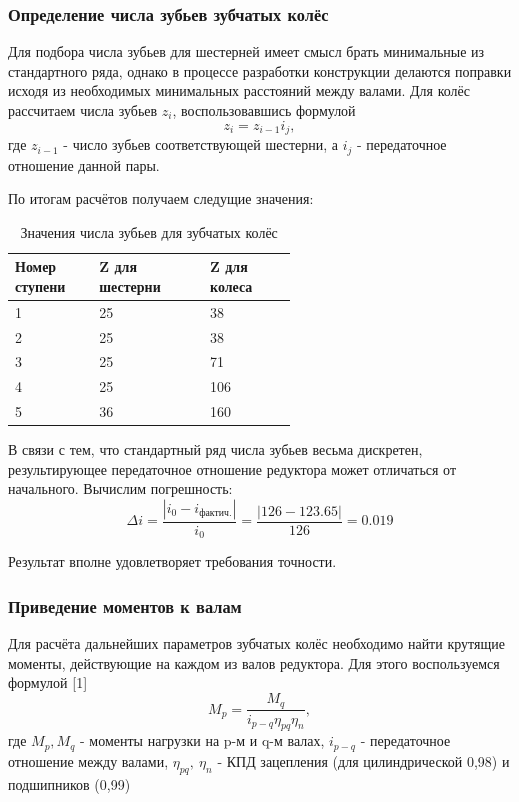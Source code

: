 \documentclass[14pt,a4paper,russian]{scrartcl}
\begin{document}
    \subsubsection{Определение числа зубьев зубчатых колёс}
        Для подбора числа зубьев для шестерней имеет смысл брать минимальные из стандартного ряда,
        однако в процессе разработки конструкции делаются поправки исходя из необходимых
        минимальных расстояний между валами.
        Для колёс рассчитаем числа зубьев \( z_i \), воспользовавшись формулой
        \[ z_i = z_{i-1}i_j, \]
        где \( z_{i-1} \) - число зубьев соответствующей шестерни, а \( i_j \) - 
        передаточное отношение данной пары.
        
        По итогам расчётов получаем следущие значения:
        \begin{table}[h!]
            \begin{center}
                \begin{tabular}{p{0.13\linewidth}p{0.23\linewidth}p{0.2\linewidth}}
                    \hline
                    Номер ступени & Z для шестерни & Z для колеса \\
                    \hline
                    1   &   25 & 38 \\
                    2   &   25 & 38 \\
                    3   &   25 & 71 \\
                    4   &   25 & 106 \\
                    5   &   36 & 160 \\
                    \hline
                \end{tabular}
                \caption{Значения числа зубьев для зубчатых колёс}\label{tab:gears_z}
            \end{center}
        \end{table}
        
        В связи с тем, что стандартный ряд числа зубьев весьма дискретен, 
        результирующее передаточное отношение редуктора может отличаться от начального.
        Вычислим погрешность:
        \[ \Delta i = \frac{|i_0 - i_{\text{фактич.}}|}{i_0} =  
            \frac{|126-123.65|}{126} = 0.019\]
        
        Результат вполне удовлетворяет требования точности.
        
    \subsubsection{Приведение моментов к валам}
        Для расчёта дальнейших параметров зубчатых колёс необходимо найти крутящие моменты,
        действующие на каждом из валов редуктора. Для этого воспользуемся формулой [1]
        \[ M_p = \frac{M_q}{i_{p-q}\eta_{pq}\eta_n}, \]
        где \( M_p, M_q \) - моменты нагрузки на p-м и q-м валах,
            \( i_{p-q} \) - передаточное отношение между валами,
            \( \eta_{pq},\ \eta_n \) - КПД зацепления (для цилиндрической 0,98) и подшипников (0,99)\par
        
\end{document}
